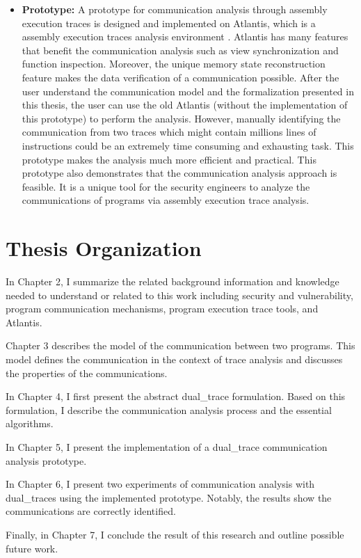 \begin{itemize}
  \item \textbf{Prototype:} A prototype for communication analysis through assembly execution traces is designed and implemented on Atlantis, which is a assembly execution traces analysis environment \cite{huang2017atlantis}. Atlantis has many features that benefit the communication analysis such as view synchronization and function inspection. Moreover, the unique memory state reconstruction feature makes the data verification of a communication possible. After the user understand the communication model and the formalization presented in this thesis, the user can use the old Atlantis (without the implementation of this prototype) to perform the analysis. However, manually identifying the communication from two traces which might contain millions lines of instructions could be an extremely time consuming and exhausting task. This prototype makes the analysis much more efficient and practical. This prototype also demonstrates that the communication analysis approach is feasible. It is a unique tool for the security engineers to analyze the communications of programs via assembly execution trace analysis. 
\end{itemize}

\section{Thesis Organization}
In Chapter 2, I summarize the related background information and knowledge needed to understand or related to this work including security and vulnerability, program communication mechanisms, program execution trace tools, and Atlantis. 

Chapter 3 describes the model of the communication between two programs. This model defines the communication in the context of trace analysis and discusses the properties of the communications. 

In Chapter 4, I first present the abstract dual\_trace formulation. Based on this formulation, I describe the communication analysis process and the essential algorithms.

In Chapter 5, I present the implementation of a dual\_trace communication analysis prototype. 

In Chapter 6, I present two experiments of communication analysis with dual\_traces using the implemented prototype. Notably, the results show the communications are correctly identified. 

Finally, in Chapter 7, I conclude the result of this research and outline possible future work.
